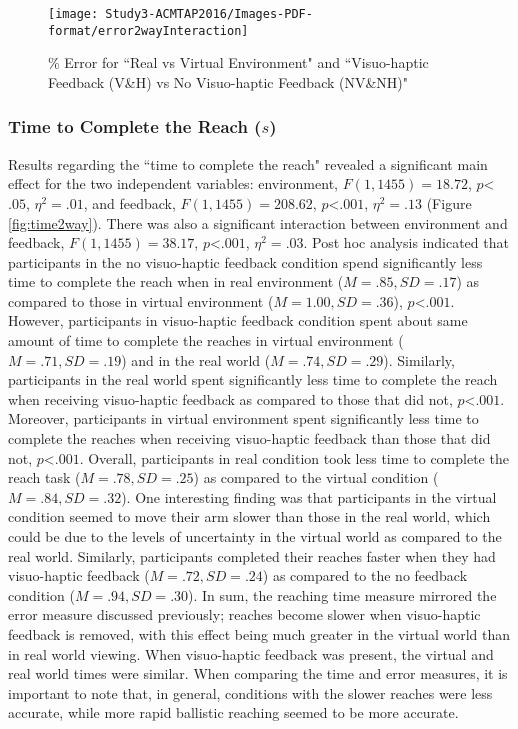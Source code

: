 \begin{figure}
	\centering
	\texttt{[image: Study3-ACMTAP2016/Images-PDF-format/error2wayInteraction]}
	\caption{\textsf{\% Error for ``Real vs Virtual Environment" and ``Visuo-haptic Feedback (V\&H) vs No Visuo-haptic Feedback (NV\&NH)"}}
	\label{fig:error2way}
\end{figure}

\subsubsection{Time to Complete the Reach ($s$)} \label{time2way}
Results regarding the ``time to complete the reach" revealed a significant main effect for the two independent variables: environment, $F(1,1455)=18.72$, $p$\textless$.05$, $\eta^{2}=.01$, and feedback, $F(1,1455)=208.62$, $p$\textless$.001$, $\eta^{2}=.13$ (Figure \ref{fig:time2way}). There was also a significant interaction between environment and feedback, $F(1,1455)=38.17$, $p$\textless$.001$, $\eta^{2}=.03$. Post hoc analysis indicated that participants in the no visuo-haptic feedback condition spend significantly less time to complete the reach when in real environment ($M=.85, SD=.17$) as compared to those in virtual environment ($M=1.00, SD=.36$), $p$\textless$.001$. However, participants in visuo-haptic feedback condition spent about same amount of time to complete the reaches in virtual environment ($M=.71, SD=.19$) and in the real world ($M=.74, SD=.29$). Similarly, participants in the real world spent significantly less time to complete the reach when receiving visuo-haptic feedback as compared to those that did not, $p$\textless$.001$. Moreover, participants in virtual environment spent significantly less time to complete the reaches when receiving visuo-haptic feedback than those that did not, $p$\textless$.001$. Overall, participants in real condition took less time to complete the reach task ($M=.78, SD=.25$) as compared to the virtual condition ($M=.84, SD=.32$). One interesting finding was that participants in the virtual condition seemed to move their arm slower than those in the real world, which could be due to the levels of uncertainty in the virtual world as compared to the real world. Similarly, participants completed their reaches faster when they had visuo-haptic feedback ($M=.72, SD=.24$) as compared to the no feedback condition ($M=.94, SD=.30$). In sum, the reaching time measure mirrored the error measure discussed previously; reaches become slower when visuo-haptic feedback is removed, with this effect being much greater in the virtual world than in real world viewing. When visuo-haptic feedback was present, the virtual and real world times were similar. When comparing the time and error measures, it is important to note that, in general, conditions with the slower reaches were less accurate, while more rapid ballistic reaching seemed to be more accurate. 



